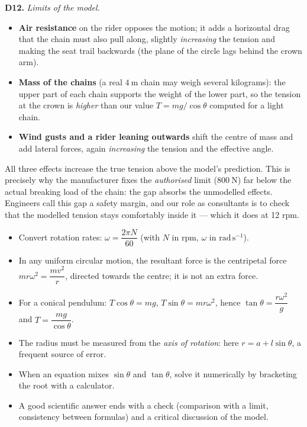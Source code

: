 \documentclass[11pt]{article}
\newcommand{\cle}[1]{{\popxbold\color{popdark}#1}}
\begin{document}
\textbf{D12.} \emph{Limits of the model.}
\begin{itemize}
\item \textbf{Air resistance} on the rider opposes the motion; it adds a horizontal drag that the chain must also pull along, slightly \emph{increasing} the tension and making the seat trail backwards (the plane of the circle lags behind the crown arm).
\item \textbf{Mass of the chains} (a real $4\ \mathrm{m}$ chain may weigh several kilograms): the upper part of each chain supports the weight of the lower part, so the tension at the crown is \emph{higher} than our value $T = mg/\cos\theta$ computed for a light chain.
\item \textbf{Wind gusts and a rider leaning outwards} shift the centre of mass and add lateral forces, again \emph{increasing} the tension and the effective angle.
\end{itemize}
All three effects increase the true tension above the model's prediction. This is precisely why the manufacturer fixes the \emph{authorised} limit ($800\ \mathrm{N}$) far below the actual breaking load of the chain: the gap absorbs the unmodelled effects. Engineers call this gap a \cle{safety margin}, and our role as consultants is to check that the modelled tension stays comfortably inside it — which it does at 12 rpm.

\begin{aretenir}
\begin{itemize}
\item Convert rotation rates: $\omega = \dfrac{2\pi N}{60}$ (with $N$ in rpm, $\omega$ in $\mathrm{rad\,s^{-1}}$).
\item In any uniform circular motion, the resultant force is the centripetal force $mr\omega^2 = \dfrac{mv^2}{r}$, directed towards the centre; it is not an extra force.
\item For a conical pendulum: $T\cos\theta = mg$, $T\sin\theta = mr\omega^2$, hence $\tan\theta = \dfrac{r\omega^2}{g}$ and $T = \dfrac{mg}{\cos\theta}$.
\item The radius must be measured from the \emph{axis of rotation}: here $r = a + l\sin\theta$, a frequent source of error.
\item When an equation mixes $\sin\theta$ and $\tan\theta$, solve it numerically by bracketing the root with a calculator.
\item A good scientific answer ends with a check (comparison with a limit, consistency between formulas) and a critical discussion of the model.
\end{itemize}
\end{aretenir}
\end{document}
